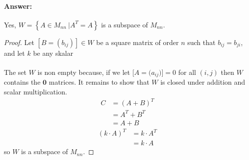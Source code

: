 \documentclass[12pt]{article}
\begin{document}
\begin{enumerate}
\begin{enumerate}
                            \paragraph{Answer:} Yes, $W={ \left\{A \in{M_{nn}} \ |
                                    A^T = A \right\}}$ is a subspace of $M_{nn}$.
                            \begin{proof}
                                    Let $[B = (b_{ij})]\in W$ be a square matrix of order $n$
                                    such that $b_{ij} = b_{ji}$, and let ${k}$ be any skalar\\\\
                                    The set $W$ is non empty because, if we let $[A=({a_{ij})]=0}$
                                    for all $(i,j)$ then $W$ contains the $\mathbf{0}$ matrices.
                                    It remains to show that $W$ is closed under addition and scalar multiplication.
                                    \begin{align*}
                                            C & = (A+B)^T \\
                                              & = A^T+B^T \\
                                              & = A + B
                                    \end{align*}
                                    \begin{align*}
                                            (k\cdot A)^{T} & = k\cdot A^{T} \\
                                                           & = k\cdot A
                                    \end{align*}
                                    so $W$ is a subspace of $M_{nn}$.
                            \end{proof}
              \end{enumerate}
\end{enumerate}
\end{document}
